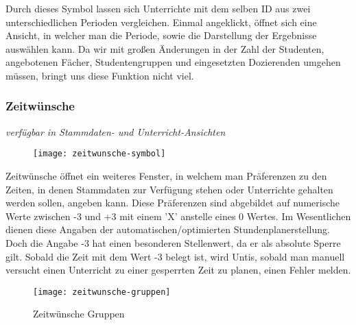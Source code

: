 \noindent
Durch dieses Symbol lassen sich Unterrichte mit dem selben ID aus zwei unterschiedlichen Perioden vergleichen. Einmal angeklickt, öffnet sich eine Ansicht, in welcher man die Periode, sowie die Darstellung der Ergebnisse auswählen kann. Da wir mit großen Änderungen in der Zahl der Studenten, angebotenen Fächer, Studentengruppen und eingesetzten Dozierenden umgehen müssen, bringt uns diese Funktion nicht viel.\\

\subsubsection{Zeitwünsche}
{\small\textit{verfügbar in Stammdaten- und Unterricht-Ansichten\\}\par}

\begin{wrapfigure}{r}{.05\textwidth}
	\vspace{-50pt}
	\texttt{[image: zeitwunsche-symbol]}
	\vspace{-35pt}
\end{wrapfigure}

\noindent
Zeitwünsche öffnet ein weiteres Fenster, in welchem man Präferenzen zu den Zeiten, in denen Stammdaten zur Verfügung stehen oder Unterrichte gehalten werden sollen, angeben kann. Diese Präferenzen sind abgebildet auf numerische Werte zwischen -3 und +3 mit einem 'X' anstelle eines 0 Wertes. Im Wesentlichen dienen diese Angaben der automatischen/optimierten Stundenplanerstellung. Doch die Angabe -3 hat einen besonderen Stellenwert, da er als absolute Sperre gilt. Sobald die Zeit mit dem Wert -3 belegt ist, wird Untis, sobald man manuell versucht einen Unterricht zu einer gesperrten Zeit zu planen, einen Fehler melden.\\

\begin{wrapfigure}{r}{0.3\textwidth}
	\vspace{-14pt}
	\texttt{[image: zeitwunsche-gruppen]}
	\vspace{-15pt}
	\caption{Zeitwünsche Gruppen}
	\label{fig:zeitwunsche-gruppen}
\end{wrapfigure}

